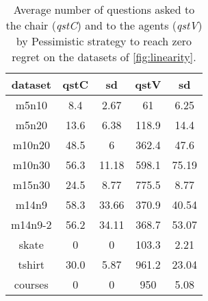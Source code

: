 \documentclass{article}
\begin{document}
\begin{table}
	\caption{Average number of questions asked to the chair (\textit{qstC}) and to the agents (\textit{qstV}) by Pessimistic strategy to reach zero regret on the datasets of \cref{fig:linearity}.}
	\label{tab:questions}
	\begin{tabular}{cS[table-number-alignment = right]@{ ± }S[table-number-alignment = left, table-figures-integer=2]S[table-number-alignment = right]@{ ± }S[table-number-alignment = left, table-figures-integer=2]}
		\toprule
		{dataset} & {qstC} & {sd} & {qstV} & {sd} \\
		\midrule
		m5n10 	&	8.4		& 2.67 		& 61		& 6.25\\
		m5n20 	&	13.6	& 6.38		& 118.9		& 14.4\\
		m10n20 	&	48.5	& 6			& 362.4		& 47.6	\\
		m10n30 	&	56.3	& 11.18		& 598.1 	& 75.19	\\
		m15n30 	&	24.5	& 8.77		& 775.5		& 8.77	\\
		m14n9 	&	58.3	& 33.66		& 370.9		& 40.54	\\
		m14n9-2 &	56.2	& 34.11		& 368.7		& 53.07 \\
		skate 	&	0		& 0			& 103.3		& 2.21	\\
		tshirt  &	30.0	& 5.87		& 961.2		& 23.04	\\
		courses & 0			& 0			& 950		& 5.08	\\
		
		\bottomrule
	\end{tabular}
\end{table}
\end{document}
